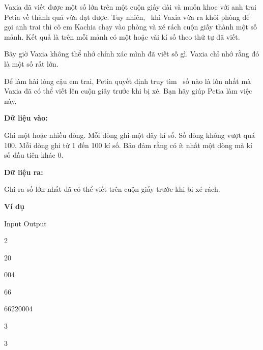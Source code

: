 



   Vaxia đã viết được một số lớn trên một cuộn giấy dài và muốn khoe với anh trai Petia về thành quả vừa đạt được. Tuy nhiên,  khi Vaxia vừa ra khỏi phòng để gọi anh trai thì cô em Kachia chạy vào phòng và xé rách cuộn giấy thành một số mảnh. Kết quả là trên mỗi mảnh có một hoặc vài kí số theo thứ tự đã viết.  

   Bây giờ Vaxia không thể nhớ chính xác mình đã viết số gì. Vaxia chỉ nhớ rằng đó là một số rất lớn.  

   Để làm hài lòng cậu em trai, Petia quyết định truy tìm  số nào là lớn nhất mà Vaxia đã có thể viết lên cuộn giây trước khi bị xé. Bạn hãy giúp Petia làm việc này.  

\textbf{Dữ liệu vào:}

   Ghi một hoặc nhiều dòng. Mỗi dòng ghi một dãy kí số. Số dòng không vượt quá 100. Mỗi dòng ghi từ 1 đến 100 kí số. Bảo đảm rằng có ít nhất một dòng mà kí số đầu tiên khác 0.  

\textbf{Dữ liệu ra:}

   Ghi ra số lớn nhất đã có thể viết trên cuộn giấy trước khi bị xé rách.  

\textbf{    Ví dụ   }

       Input                      Output                        

       2       


       20       


       004       


       66      

       66220004      

       3      

       3      
